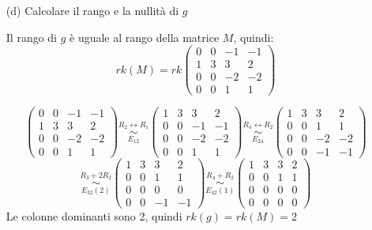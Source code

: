 \documentclass[a4paper]{article}
\theoremstyle{break}
\theoremstyle{break}
\theoremstyle{break}
\theoremstyle{break}
\begin{document}
\begin{enumerate}
	\item[(d)] Calcolare il rango e la nullità di \( g \)

    \vspace{1em}
    \noindent Il rango di \( g \) è uguale al rango della matrice \( M \), quindi:
    \[
      rk(M) = rk \begin{pmatrix} 
        0 & 0 & -1 & -1\\
        1 & 3 & 3 & 2\\
        0 & 0 & -2 & -2\\
        0 & 0 & 1 & 1
      \end{pmatrix}
    \]

    \[
    \begin{pmatrix} 
      0 & 0 & -1 & -1\\
      1 & 3 & 3 & 2\\
      0 & 0 & -2 & -2\\
      0 & 0 & 1 & 1
    \end{pmatrix} 
    \stackrel{R_2 \leftrightarrow R_1}{\underset{E_{12}}{\sim}}
    \begin{pmatrix} 
      1 & 3 & 3 & 2\\
      0 & 0 & -1 & -1\\
      0 & 0 & -2 & -2\\
      0 & 0 & 1 & 1
    \end{pmatrix}
    \stackrel{R_4 \leftrightarrow R_2}{\underset{E_{24}}{\sim}}
    \begin{pmatrix} 
      1 & 3 & 3 & 2\\
      0 & 0 & 1 & 1\\
      0 & 0 & -2 & -2\\
      0 & 0 & -1 & -1
    \end{pmatrix} 
    \] 
    \[
      \stackrel{R_3 + 2R_2}{\underset{E_{32}(2)}{\sim}}
      \begin{pmatrix} 
        1 & 3 & 3 & 2\\
        0 & 0 & 1 & 1\\
        0 & 0 & 0 & 0\\
        0 & 0 & -1 & -1
      \end{pmatrix} 
      \stackrel{R_4 + R_2}{\underset{E_{42}(1)}{\sim}}
      \begin{pmatrix} 
        1 & 3 & 3 & 2\\
        0 & 0 & 1 & 1\\
        0 & 0 & 0 & 0\\
        0 & 0 & 0 & 0
      \end{pmatrix}
    \] 
    Le colonne dominanti sono 2, quindi \( rk(g) = rk(M) = 2 \) 


\end{enumerate}
\end{document}
